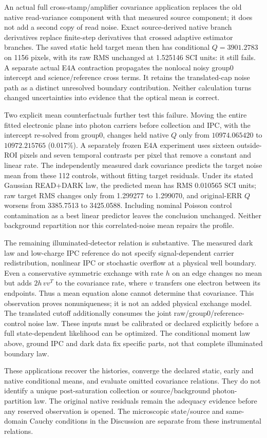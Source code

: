 An actual full cross-stamp/amplifier covariance application replaces
the old native read-variance component with that measured source
component; it does not add a second copy of read noise. Exact
source-derived native branch derivatives replace finite-step derivatives
that crossed adaptive estimator branches. The saved static held target
mean then has conditional $Q=3901.2783$ on 1156 pixels, with its raw
RMS unchanged at 1.525146 SCI units: it still fails. A separate actual
E4A contraction propagates the nonlocal noisy group0 intercept and
science/reference cross terms. It retains the translated-cap noise
path as a distinct unresolved boundary contribution. Neither calculation
turns changed uncertainties into evidence that the optical mean is correct.

Two explicit mean counterfactuals further test this failure. Moving the
entire fitted electronic plane into photon carriers before collection
and IPC, with the intercept re-solved from group0, changes held native
$Q$ only from $10974.065420$ to $10972.215765$ (0.017\%). A separately
frozen E4A experiment uses sixteen outside-ROI pixels and seven temporal
contrasts per pixel that remove a constant and linear rate. The independently
measured dark covariance predicts the target noise mean from these 112
controls, without fitting target residuals. Under its stated Gaussian
READ+DARK law, the predicted mean has RMS 0.010565 SCI units; raw target
RMS changes only from 1.299277 to 1.299070, and original-ERR $Q$ worsens
from 3385.7513 to 3425.0588. Including nominal Poisson control contamination
as a best linear predictor leaves the conclusion unchanged. Neither
background repartition nor this correlated-noise mean repairs the profile.

The remaining illuminated-detector relation is substantive. The measured
dark law and low-charge IPC reference do not specify signal-dependent
carrier redistribution, nonlinear IPC or stochastic overflow at a physical
well boundary. Even a conservative symmetric exchange with rate $h$ on
an edge changes no mean but adds $2h\,vv^T$ to the covariance rate,
where $v$ transfers one electron between its endpoints. Thus a mean
equation alone cannot determine that covariance. This observation proves
nonuniqueness; it is not an added physical exchange model. The translated
cutoff additionally consumes the joint raw/group0/reference-control
noise law. These inputs must be calibrated or declared explicitly before
a full state-dependent likelihood can be optimized. The conditional
moment law above, ground IPC and dark data fix specific parts, not that
complete illuminated boundary law.

These applications recover the histories, converge the declared
static, early and native conditional means, and evaluate omitted covariance
relations. They do not identify a unique post-saturation collection or
source/background photon-partition law. The original native residuals
remain the adequacy evidence before any reserved observation is opened.
The microscopic state/source and same-domain Cauchy conditions in the
Discussion are separate from these instrumental relations.

